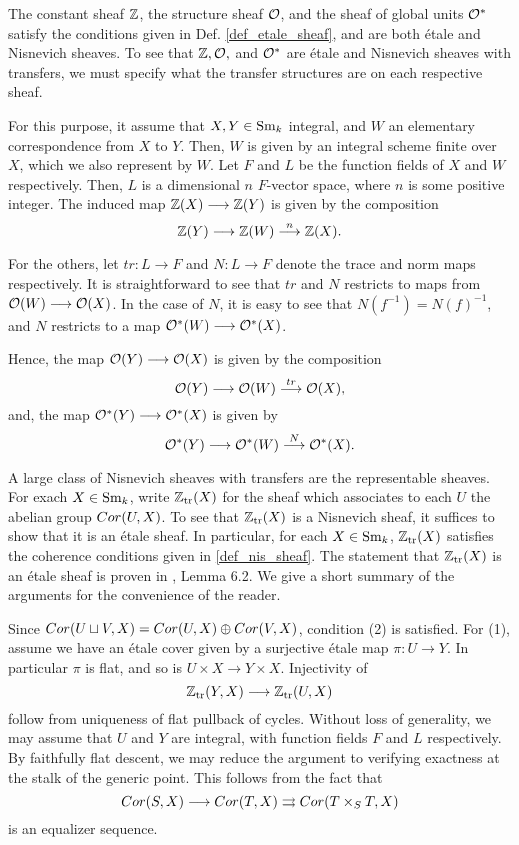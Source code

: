 \begin{ex}\label{ex_Z_O_Ostar}
The constant sheaf $\mathbb{Z}$, the structure sheaf $\mathcal{O}$, and the sheaf
of global units $\mathcal{O}^*$ satisfy the conditions given in Def. 
\ref{def_etale_sheaf}, and are both \'etale and Nisnevich sheaves.
To see that $\mathbb{Z}, \mathcal{O},$ and $\mathcal{O}^*$ are \'etale and Nisnevich sheaves
with transfers, we must specify what the transfer structures are
on each respective sheaf.

For this purpose, it assume that $X, Y \in \mathrm{Sm}_{k}$ integral, and
$W$ an elementary correspondence from $X$ to $Y$. Then, $W$ is
given by an integral scheme finite over $X$, which we also 
represent by $W$. Let $F$ and $L$ be the function fields of $X$ 
and $W$ respectively. Then, $L$ is a dimensional $n$ $F$-vector 
space, where $n$ is some positive integer. The induced map $\mathbb{Z}(X) 
\longrightarrow \mathbb{Z}(Y)$ is given by the composition
\[
\mathbb{Z}(Y) \longrightarrow \mathbb{Z}(W) \stackrel{n}{\longrightarrow} \mathbb{Z}(X).
\]

For the others, let $tr: L \to F$ and $N: L \to F$ denote the 
trace and norm maps respectively. It is straightforward to see 
that $tr$ and $N$ restricts to maps from $\mathcal{O}(W) \longrightarrow \mathcal{O}(X)$. In
the case of $N$, it is easy to see that $N(f^{-1}) = N(f)^{-1}$,
and $N$ restricts to a map $\mathcal{O}^*(W) \longrightarrow \mathcal{O}^*(X)$.

Hence, the map $\mathcal{O}(Y) \longrightarrow \mathcal{O}(X)$ is given by the composition
\[
\mathcal{O}(Y) \longrightarrow \mathcal{O}(W) \stackrel{tr}{\longrightarrow} \mathcal{O}(X),
\]
and, the map $\mathcal{O}^*(Y) \longrightarrow \mathcal{O}^*(X)$ is given by
\[
\mathcal{O}^*(Y) \longrightarrow \mathcal{O}^*(W) \stackrel{N}{\longrightarrow} \mathcal{O}^*(X).
\]
\end{ex}

\begin{ex}\label{ex_ZtrX}
A large class of Nisnevich sheaves with transfers are the 
representable sheaves. For exach $X \in \mathrm{Sm}_{k}$, write $\mathbb{Z}_{\mathrm{tr}}(X)$
for the sheaf which associates to each $U$ the abelian group
$Cor(U, X)$. To see that $\mathbb{Z}_{\mathrm{tr}}(X)$ is a Nisnevich sheaf, it
suffices to show that it is an \'etale sheaf. In particular,
for each $X \in \mathrm{Sm}_{k}$, $\mathbb{Z}_{\mathrm{tr}}(X)$ satisfies the coherence 
conditions given in \ref{def_nis_sheaf}. The statement that
$\mathbb{Z}_{\mathrm{tr}}(X)$ is an \'etale sheaf is proven in \cite{MVW}, Lemma 6.2.
We give a short summary of the arguments for the convenience of
the reader.

Since $Cor(U \sqcup V, X) = Cor(U, X) \oplus Cor(V, X)$, condition 
(2) is satisfied. For (1), assume we have an \'etale cover given
by a surjective \'etale map $\pi: U \to Y$. In particular $\pi$ is
flat, and so is $U \times X \to Y \times X$. Injectivity of
\[
\mathbb{Z}_{\mathrm{tr}}(Y, X) \longrightarrow \mathbb{Z}_{\mathrm{tr}}(U, X)
\]
follow from uniqueness of flat pullback of cycles. Without loss
of generality, we may assume that $U$ and $Y$ are integral, with
function fields $F$ and $L$ respectively. By faithfully flat 
descent, we may reduce the argument to verifying exactness at
the stalk of the generic point. This follows from the fact that
\[
Cor(S, X) \longrightarrow Cor(T, X) \rightrightarrows Cor(T \times_S T, X)
\]
is an equalizer sequence.
\end{ex}

